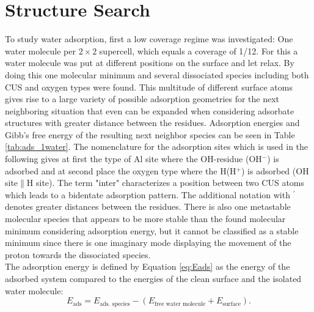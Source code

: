 \documentclass[11pt,DIV=13,BCOR=5mm,a4paper,headinclude]{scrbook}
\begin{document}
\section{Structure Search}\label{structure_search11-20}
To study water adsorption, first a low coverage regime was investigated: One water molecule per $2\times 2$ supercell, which equals a coverage of 1/12.
For this a water molecule was put at different positions on the surface and let relax.
By doing this one molecular minimum and several dissociated species including both CUS and oxygen types were found.
This multitude of different surface atoms gives rise to a large variety of possible adsorption geometries for the next neighboring situation that even can be expanded when considering adsorbate structures with greater distance between the residues.
Adsorption energies and Gibb's free energy of the resulting next neighbor species can be seen in Table \ref{tab:ads_1water}.
The nomenclature for the adsorption sites which is used in the following gives at first the type of Al site where the OH-residue (OH$^-$) is adsorbed and at second place the oxygen type where the H(H$^+$) is adsorbed (OH site$\parallel$H site).
The term "inter" characterizes a position between two CUS atoms which leads to a bidentate adsorption pattern.
The additional notation with $^\prime$ denotes greater distances between the residues.
There is also one metastable molecular species that appears to be more stable than the found molecular minimum considering adsorption energy, but it cannot be classified as a stable minimum since there is one imaginary mode displaying the movement of the proton towards the dissociated species.
\\
The adsorption energy is defined by Equation \ref{eq:Eads} as the energy of the adsorbed system compared to the energies of the clean surface and the isolated water molecule:
\begin{equation}\label{eq:Eads}
 E_\textrm{ads}=E_\text{ads. species}-(E_\text{free water molecule}+E_\text{surface}).
\end{equation}
\end{document}
